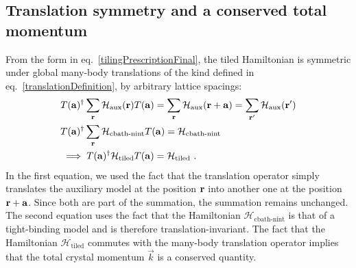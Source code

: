 \documentclass[reprint,hidelinks]{revtex4-2}
\begin{document}
\subsection{Translation symmetry and a conserved total momentum}
From the form in eq.~\ref{tilingPrescriptionFinal}, the tiled Hamiltonian is symmetric under global many-body translations of the kind defined in eq.~\ref{translationDefinition}, by arbitrary lattice spacings:
\begin{equation}\begin{aligned}\label{translationSymmetry}
	&T({\bf a})^\dagger\sum_{{\bf r}}\mathcal{H}_\text{aux}({\bf r})T({\bf a}) = \sum_{{\bf r}}\mathcal{H}_\text{aux}({\bf r + a}) = \sum_{{\bf r}^\prime}\mathcal{H}_\text{aux}({\bf r}^\prime)\\
	&T({\bf a})^\dagger\sum_{{\bf r}}\mathcal{H}_\text{cbath-nint}T({\bf a}) = \mathcal{H}_\text{cbath-nint}\\
	&\implies T({\bf a})^\dagger\mathcal{H}_\text{tiled}T({\bf a}) = \mathcal{H}_\text{tiled}~.
\end{aligned}\end{equation}
In the first equation, we used the fact that the translation operator simply translates the auxiliary model at the position \({\bf r}\) into another one at the position \({\bf r} + {\bf a}\). Since both are part of the summation, the summation remains unchanged. The second equation uses the fact that the Hamiltonian \(\mathcal{H}_\text{cbath-nint}\) is that of a tight-binding model and is therefore translation-invariant. The fact that the Hamiltonian \(\mathcal{H}_\text{tiled}\) commutes with the many-body translation operator implies that the total crystal momentum \(\vec k\) is a conserved quantity.
\end{document}
